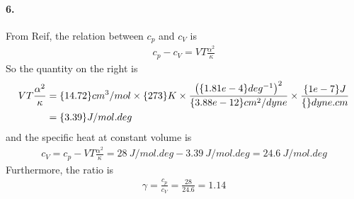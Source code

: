 \documentclass[../main.tex]{subfiles}
\begin{document}
\newpage %
\paragraph{6.} 
From Reif, the relation between $c_p$ and $c_V$ is
\begin{align*} \tag{5.7.13} 
    c_p - c_V = VT \frac{\alpha^2}{\kappa}
\end{align*}
So the quantity on the right is
\begin{align*}
    VT \frac{\alpha^2}{\kappa} &= \qty{14.72}{cm^3/mol} \times \qty{273}{K} \times
    \frac{\qt(\qty{1.81e-4}{deg^{-1}})^2}{\qty{3.88e-12}{cm^2/dyne}} \times \frac{\qty{1e-7}{J}}{\qty{}{dyne.cm}} \\
    &= \qty{3.39}{J / mol.deg}
\end{align*}
and the specific heat at constant volume is
\begin{align*}
    c_V = c_p - VT \frac{\alpha^2}{\kappa} = \qty{28}{J / mol.deg} - \qty{3.39}{J / mol.deg} = \boxed{\qty{24.6}{J / mol.deg}}
\end{align*}
Furthermore, the ratio is
\begin{align*}
    \gamma = \frac{c_p}{c_V} = \frac{28}{24.6} = \boxed{1.14}
\end{align*}

\newpage %
\end{document}
